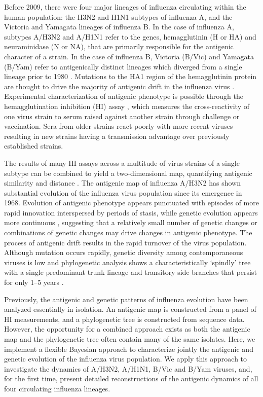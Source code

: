 \documentclass[11pt,oneside,letterpaper]{article}
\begin{document}
Before 2009, there were four major lineages of influenza circulating within the human population: the H3N2 and H1N1 subtypes of influenza A, and the Victoria and Yamagata lineages of influenza B. 
In the case of influenza A, subtypes A/H3N2 and A/H1N1 refer to the genes, hemagglutinin (H or HA) and neuraminidase (N or NA), that are primarily responsible for the antigenic character of a strain. 
In the case of influenza B, Victoria (B/Vic) and Yamagata (B/Yam) refer to antigenically distinct lineages which diverged from a single lineage prior to 1980 \cite{Rota90}.
Mutations to the HA1 region of the hemagglutinin protein are thought to drive the majority of antigenic drift in the influenza virus \cite{Wiley81, Nelson07NatRevGenet}. 
Experimental characterization of antigenic phenotype is possible through the hemagglutination inhibition (HI) assay \cite{Hirst43}, which measures the cross-reactivity of one virus strain to serum raised against another strain through challenge or vaccination. 
Sera from older strains react poorly with more recent viruses resulting in new strains having a transmission advantage over previously established strains.

The results of many HI assays across a multitude of virus strains of a single subtype can be combined to yield a two-dimensional map, quantifying antigenic similarity and distance \cite{Smith04}. 
The antigenic map of influenza A/H3N2 has shown substantial evolution of the influenza virus population since its emergence in 1968. 
Evolution of antigenic phenotype appears punctuated with episodes of more rapid innovation interspersed by periods of stasis, while genetic evolution appears more continuous \cite{Smith04}, suggesting that a relatively small number of genetic changes or combinations of genetic changes may drive changes in antigenic phenotype. 
The process of antigenic drift results in the rapid turnover of the virus population. 
Although mutation occurs rapidly, genetic diversity among contemporaneous viruses is low and phylogenetic analysis shows a characteristically `spindly' tree with a single predominant trunk lineage and transitory side branches that persist for only 1--5 years \cite{Fitch97}.

Previously, the antigenic and genetic patterns of influenza evolution have been analyzed essentially in isolation. 
An antigenic map is constructed from a panel of HI measurements, and a phylogenetic tree is constructed from sequence data. 
However, the opportunity for a combined approach exists as both the antigenic map and the phylogenetic tree often contain many of the same isolates. 
Here, we implement a flexible Bayesian approach to characterize jointly the antigenic and genetic evolution of the influenza virus population. 
We apply this approach to investigate the dynamics of A/H3N2, A/H1N1, B/Vic and B/Yam viruses, and, for the first time, present detailed reconstructions of the antigenic dynamics of all four circulating influenza lineages.
\end{document}
